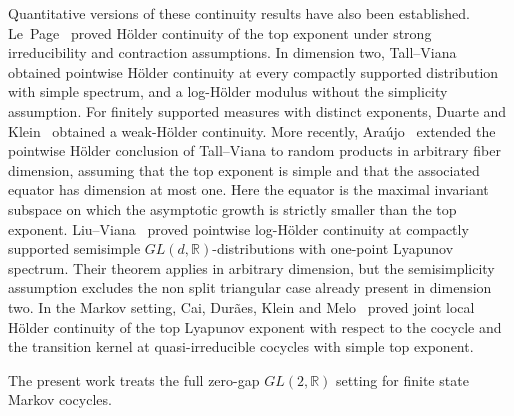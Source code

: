 \documentclass[11pt,a4paper]{amsart}
\theoremstyle{definition}
\theoremstyle{remark}
\numberwithin{equation}{section}
\newcommand{\1}{\boldsymbol 1}
\begin{document}
Quantitative versions of these continuity results have also been established.
Le~Page~\cite{LePage} proved Hölder continuity of the top exponent under strong irreducibility and contraction assumptions. In dimension two, Tall--Viana~\cite{TV} obtained pointwise Hölder continuity at every compactly supported distribution with simple spectrum, and a log-Hölder modulus without the simplicity assumption.
For finitely supported measures with distinct exponents, Duarte and
Klein~\cite{DK20} obtained a weak-Hölder continuity.
More recently, Araújo~\cite{Araujo26} extended the pointwise Hölder
conclusion of Tall--Viana to random products in arbitrary fiber
dimension, assuming that the top exponent is simple and that the
associated equator has dimension at most one. Here the equator is the
maximal invariant subspace on which the asymptotic growth is strictly
smaller than the top exponent. Liu--Viana~\cite{LV26} proved pointwise log-Hölder continuity at compactly supported semisimple \(GL(d,\mathbb R)\)-distributions with one-point Lyapunov spectrum. Their theorem applies in arbitrary dimension, but the semisimplicity assumption excludes the non split triangular case already present in dimension two. In the Markov setting, Cai, Durães, Klein and Melo~\cite{CDKM} proved joint local Hölder continuity of the top Lyapunov exponent with respect to the cocycle and the transition kernel at quasi-irreducible cocycles with simple top exponent.

The present work treats the full zero-gap $GL(2,\mathbb R)$ setting for finite state Markov cocycles.%
\end{document}
